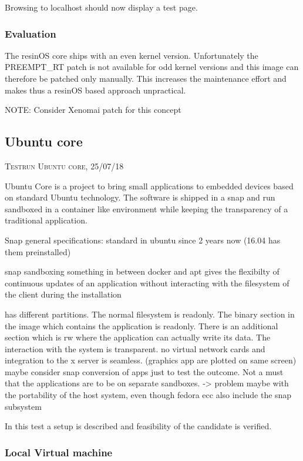 \documentclass[]{scrartcl}
\begin{document}
Browsing to localhost should now display a test page.

\subsubsection{Evaluation}

The resinOS core ships with an even kernel version. Unfortunately the PREEMPT\_RT patch is not available for odd kernel versions and this image can therefore be patched only manually. This increases the maintenance effort and makes thus a resinOS based approach unpractical.

NOTE: Consider Xenomai patch for this concept

\subsection{Ubuntu core}
{\small\textsc{Testrun Ubuntu core, 25/07/18} \bigskip}

Ubuntu Core is a project to bring small applications to embedded devices based on standard Ubuntu technology. The software is shipped in a snap and run sandboxed in a container like environment while keeping the transparency of a traditional application. 


Snap general specifications:
standard in ubuntu since 2 years now (16.04 has them preinstalled)

snap sandboxing
something in between docker and apt
gives the flexibilty of continuous updates of an application without interacting with the filesystem of the client during the installation

has different partitions. The normal filesystem is readonly. The binary section in the image which contains the application is readonly. There is an additional section which is rw where the application can actually write its data. 
The interaction with the system is transparent. no virtual network cards and integration to the x server is seamless. (graphics app are plotted on same screen)
maybe consider snap conversion of apps just to test the outcome. Not a must that the applications are to be on separate sandboxes. -> problem maybe with the portability of the host system, even though fedora ecc also include the snap subsystem

In this test a setup is described and feasibility of the candidate is verified.

\subsubsection{Local Virtual machine}
\end{document}
